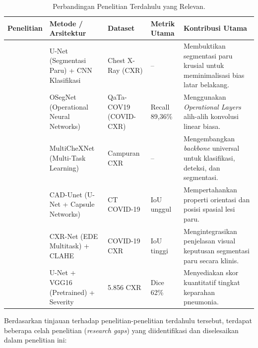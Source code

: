 \documentclass[12pt,a4paper,oneside]{book}
\begin{document}
\begin{table}[htbp]
  \centering
  \caption{Perbandingan Penelitian Terdahulu yang Relevan.}
  \label{tab:penelitian_terdahulu}
  \fontsize{10pt}{14pt}\selectfont
  \begin{tabularx}{\textwidth}{p{2.2cm}p{2.5cm}p{1.8cm}p{1.7cm}X}
    \toprule
    \textbf{Penelitian} & \textbf{Metode / Arsitektur} & \textbf{Dataset} & \textbf{Metrik Utama} & \textbf{Kontribusi Utama} \\
    \midrule
    \textcite{teixeira2020} & U-Net (Segmentasi Paru) + CNN Klasifikasi & Chest X-Ray (CXR) & -- & Membuktikan segmentasi paru krusial untuk meminimalisasi bias latar belakang. \\
    \midrule
    \textcite{degerli2022} & OSegNet (Operational Neural Networks) & QaTa-COV19 (COVID-CXR) & Recall 89,36\% & Menggunakan \textit{Operational Layers} alih-alih konvolusi linear biasa. \\
    \midrule
    \textcite{farag2020} & MultiCheXNet (Multi-Task Learning) & Campuran CXR & -- & Mengembangkan \textit{backbone} universal untuk klasifikasi, deteksi, dan segmentasi. \\
    \midrule
    \textcite{dang2024} & CAD-Unet (U-Net + Capsule Networks) & CT COVID-19 & IoU unggul & Mempertahankan properti orientasi dan posisi spasial lesi paru. \\
    \midrule
    \textcite{zhang2021} & CXR-Net (EDE Multitask) + CLAHE & COVID-19 CXR & IoU tinggi & Mengintegrasikan penjelasan visual keputusan segmentasi paru secara klinis. \\
    \midrule
    \textcite{mallidi2024} & U-Net + VGG16 (Pretrained) + Severity & 5.856 CXR & Dice 62\% & Menyediakan skor kuantitatif tingkat keparahan pneumonia. \\
    \bottomrule
  \end{tabularx}
\end{table}Berdasarkan tinjauan terhadap penelitian-penelitian terdahulu tersebut, terdapat beberapa celah penelitian (\textit{research gaps}) yang diidentifikasi dan diselesaikan dalam penelitian ini:
\end{document}
